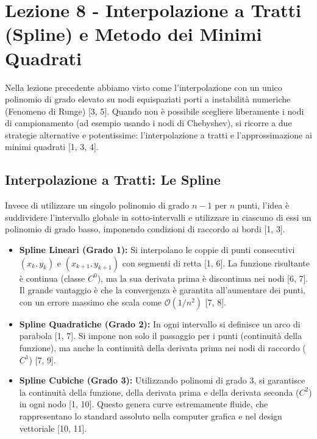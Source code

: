 \documentclass[12pt,a4paper]{article}
\begin{document}
\newpage
\section{Lezione 8 - Interpolazione a Tratti (Spline) e Metodo dei Minimi Quadrati}

Nella lezione precedente abbiamo visto come l'interpolazione con un unico polinomio di grado elevato su nodi equispaziati porti a instabilità numeriche (Fenomeno di Runge) [3, 5]. Quando non è possibile scegliere liberamente i nodi di campionamento (ad esempio usando i nodi di Chebyshev), si ricorre a due strategie alternative e potentissime: l'interpolazione a tratti e l'approssimazione ai minimi quadrati [1, 3, 4].

\subsection{Interpolazione a Tratti: Le Spline}
Invece di utilizzare un singolo polinomio di grado $n-1$ per $n$ punti, l'idea è suddividere l'intervallo globale in sotto-intervalli e utilizzare in ciascuno di essi un polinomio di grado basso, imponendo condizioni di raccordo ai bordi [1, 3]. 

\begin{itemize}
    \item \textbf{Spline Lineari (Grado 1):} Si interpolano le coppie di punti consecutivi $(x_k, y_k)$ e $(x_{k+1}, y_{k+1})$ con segmenti di retta [1, 6]. La funzione risultante è continua (classe $C^0$), ma la sua derivata prima è discontinua nei nodi [6, 7]. Il grande vantaggio è che la convergenza è garantita all'aumentare dei punti, con un errore massimo che scala come $\mathcal{O}(1/n^2)$ [7, 8].
    
    \item \textbf{Spline Quadratiche (Grado 2):} In ogni intervallo si definisce un arco di parabola [1, 7]. Si impone non solo il passaggio per i punti (continuità della funzione), ma anche la continuità della derivata prima nei nodi di raccordo ($C^1$) [7, 9]. 
    
    \item \textbf{Spline Cubiche (Grado 3):} Utilizzando polinomi di grado 3, si garantisce la continuità della funzione, della derivata prima e della derivata seconda ($C^2$) in ogni nodo [1, 10]. Questo genera curve estremamente fluide, che rappresentano lo standard assoluto nella computer grafica e nel design vettoriale [10, 11].
\end{itemize}
\end{document}
